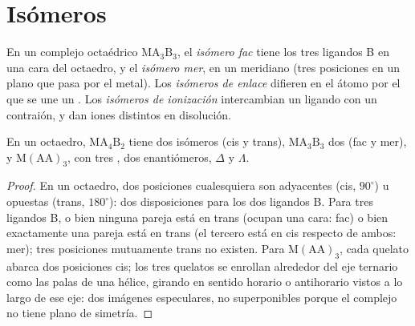 \section{Isómeros}

\begin{definition}\label{def:b2:coordination-complexes:isomers}
En un complejo octaédrico $\mathrm{MA_3B_3}$, el \emph{isómero fac} tiene
los tres ligandos B en una cara del octaedro, y el \emph{isómero
mer}, en un meridiano (tres posiciones en un plano que pasa por el
metal). Los \emph{isómeros de enlace} difieren en el átomo por el que
se une un . Los \emph{isómeros de ionización}
intercambian un ligando con un contraión, y dan iones distintos en disolución.
\end{definition}

\begin{proposition}\label{prop:b2:coordination-complexes:isomer-count}
En un octaedro, $\mathrm{MA_4B_2}$ tiene dos isómeros (cis y trans), $\mathrm{MA_3B_3}$ dos
(fac y mer), y $\mathrm M(\mathrm{AA})_3$, con tres , dos
enantiómeros, $\Delta$ y $\Lambda$.
\end{proposition}

\begin{proof}
En un octaedro, dos posiciones cualesquiera son adyacentes (cis, $90^\circ$) u opuestas
(trans, $180^\circ$): dos disposiciones para los dos ligandos B. Para tres ligandos B,
o bien ninguna pareja está en trans (ocupan una cara: fac) o bien exactamente una pareja está en trans (el
tercero está en cis respecto de ambos: mer); tres posiciones mutuamente trans no existen. Para
$\mathrm M(\mathrm{AA})_3$, cada quelato abarca dos posiciones cis; los tres quelatos
se enrollan alrededor del eje ternario como las palas de una hélice, girando en sentido horario
o antihorario vistos a lo largo de ese eje: dos imágenes especulares, no superponibles
porque el complejo no tiene plano de simetría.
\end{proof}

